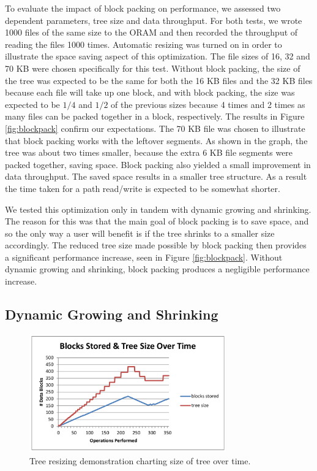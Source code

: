 \documentclass[conference]{IEEEtran}
\begin{document}
To evaluate the impact of block packing on performance, we assessed two dependent parameters, tree size and data throughput. For both tests, we wrote 1000 files of the same size to the ORAM and then recorded the throughput of reading the files 1000 times. Automatic resizing was turned on in order to illustrate the space saving aspect of this optimization. The file sizes of 16, 32 and 70 KB were chosen specifically for this test. Without block packing, the size of the tree was expected to be the same for both the 16 KB files and the 32 KB files because each file will take up one block, and with block packing, the size was expected to be $1/4$ and $1/2$ of the previous sizes because 4 times and 2 times as many files can be packed together in a block, respectively. The results in Figure \ref{fig:blockpack} confirm our expectations. The 70 KB file was chosen to illustrate that block packing works with the leftover segments. As shown in the graph, the tree was about two times smaller, because the extra 6 KB file segments were packed together, saving space. Block packing also yielded a small improvement in data throughput. The saved space results in a smaller tree structure. As a result the time taken for a path read/write is expected to be somewhat shorter.

We tested this optimization only in tandem with dynamic growing and shrinking. The reason for this was that the main goal of block packing is to save space, and so the only way a user will benefit is if the tree shrinks to a smaller size accordingly. The reduced tree size made possible by block packing then provides a significant performance increase, seen in Figure \ref{fig:blockpack}. Without dynamic growing and shrinking, block packing produces a negligible performance increase.

\subsection{Dynamic Growing and Shrinking}
\begin{figure}
\begin{center}
\noindent\includegraphics[width=8.5cm]{560.pdf}
\caption{Tree resizing demonstration charting size of tree over time.}
\label{fig:resizing}
\end{center}
\end{figure}
\end{document}
